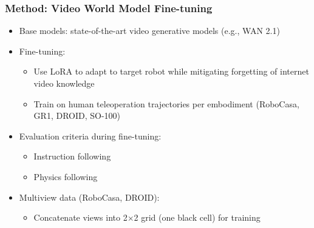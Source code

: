 \documentclass{beamer}
\begin{document}
\begin{frame}
  \frametitle{Method: Video World Model Fine-tuning}
  \small
  \begin{itemize}
    \item Base models: state-of-the-art video generative models (e.g., WAN 2.1) \cite[Sec. 2.1]{}
    \item Fine-tuning:
      \begin{itemize}
        \item Use LoRA to adapt to target robot while mitigating forgetting of internet video knowledge
        \item Train on human teleoperation trajectories per embodiment (RoboCasa, GR1, DROID, SO-100)
      \end{itemize}
    \item Evaluation criteria during fine-tuning:
      \begin{itemize}
        \item Instruction following
        \item Physics following
      \end{itemize}
    \item Multiview data (RoboCasa, DROID):
      \begin{itemize}
        \item Concatenate views into 2$\times$2 grid (one black cell) for training
      \end{itemize}
  \end{itemize}
\end{frame}
\end{document}
